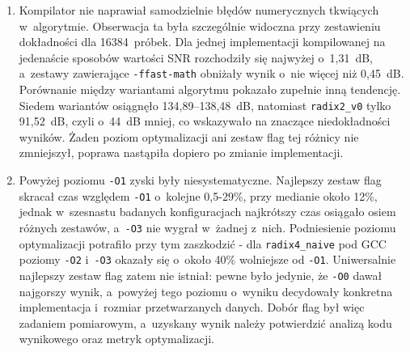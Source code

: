 \begin{enumerate}
    \item Kompilator nie naprawiał samodzielnie błędów numerycznych tkwiących
          w~algorytmie. Obserwacja ta była szczególnie widoczna przy zestawieniu
          dokładności dla 16384~próbek. Dla jednej implementacji kompilowanej na
          jedenaście sposobów wartości SNR rozchodziły się najwyżej o~1,31~dB,
          a~zestawy zawierające \texttt{-ffast-math} obniżały wynik o~nie więcej
          niż 0,45~dB. Porównanie między wariantami algorytmu pokazało zupełnie
          inną tendencję. Siedem wariantów osiągnęło 134,89--138,48~dB, natomiast
          \texttt{radix2\_v0} tylko 91,52~dB, czyli o~44~dB mniej, co wskazywało
          na znaczące niedokładności wyników. Żaden poziom optymalizacji ani
          zestaw flag tej różnicy nie zmniejszył, poprawa nastąpiła dopiero po
          zmianie implementacji.

    \item Powyżej poziomu \texttt{-O1} zyski były niesystematyczne. Najlepszy
          zestaw flag skracał czas względem \texttt{-O1} o~kolejne 0,5-29\%, przy
          medianie około 12\%, jednak w~szesnastu badanych konfiguracjach
          najkrótszy czas osiągało osiem różnych zestawów, a~\texttt{-O3} nie
          wygrał w~żadnej z~nich. Podniesienie poziomu optymalizacji potrafiło
          przy tym zaszkodzić - dla \texttt{radix4\_naive} pod GCC poziomy
          \texttt{-O2} i~\texttt{-O3} okazały się o~około 40\% wolniejsze od
          \texttt{-O1}. Uniwersalnie najlepszy zestaw flag zatem nie istniał:
          pewne było jedynie, że \texttt{-O0} dawał najgorszy wynik, a~powyżej
          tego poziomu o~wyniku decydowały konkretna implementacja i~rozmiar
          przetwarzanych danych. Dobór flag był więc zadaniem pomiarowym,
          a~uzyskany wynik należy potwierdzić analizą kodu wynikowego oraz metryk
          optymalizacji.


\end{enumerate}
